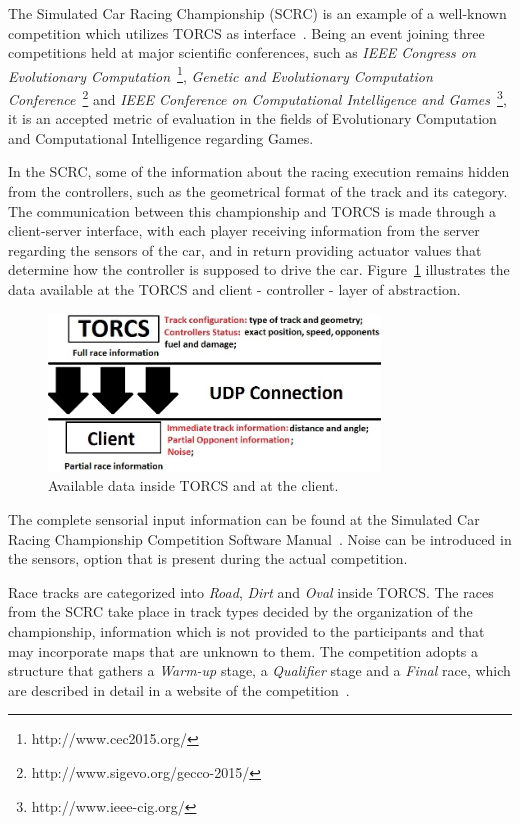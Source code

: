 	The Simulated Car Racing Championship (SCRC) is an example of a well-known competition which utilizes TORCS as interface~\cite{SCR}. Being an event joining three competitions held at major scientific conferences, such as \emph{IEEE Congress on Evolutionary Computation}~\footnote{http://www.cec2015.org/}, \emph{Genetic and Evolutionary Computation Conference}~\footnote{http://www.sigevo.org/gecco-2015/} and \emph{IEEE Conference on Computational Intelligence and Games}~\footnote{http://www.ieee-cig.org/}, it is an accepted metric of evaluation in the fields of Evolutionary Computation and Computational Intelligence regarding Games.
	
	In the SCRC, some of the information about the racing execution remains hidden from the controllers, such as the geometrical format of the track and its category. The communication between this championship and TORCS is made through a client-server interface, with each player receiving information from the server regarding the sensors of the car, and in return providing actuator values that determine how the controller is supposed to drive the car. Figure~\ref{Fig:1} illustrates the data available at the TORCS and client - controller - layer of abstraction.

   	\begin{figure}[h]
		\centering
		\includegraphics[width=250pt]{Figure1}
		\caption{\label{Fig:1}Available data inside TORCS and at the client.}
	\end{figure}
	
	The complete sensorial input information can be found at the Simulated Car Racing Championship Competition Software Manual~\cite{SCRC}. Noise can be introduced in the sensors, option that is present during the actual competition.

	Race tracks are categorized into \emph{Road}, \emph{Dirt} and \emph{Oval} inside TORCS. The races from the SCRC take place in track types decided by the organization of the championship, information which is not provided to the participants and that may incorporate maps that are unknown to them. The competition adopts a structure that gathers a \textit{Warm-up} stage, a \textit{Qualifier} stage and a \textit{Final} race, which are described in detail in a website of the competition~\cite{SCRC}.
	
